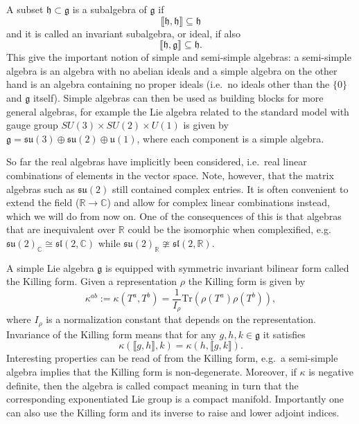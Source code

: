 A subset $\mathfrak{h}\subset \mathfrak{g}$ is a subalgebra of $\mathfrak{g}$ if \begin{equation}
    \llbracket\mathfrak{h},\mathfrak{h}\rrbracket\subseteq \mathfrak{h}
\end{equation} 
and it is called an invariant subalgebra, or ideal, if also
\begin{equation}
    \llbracket\mathfrak{h},\mathfrak{g}\rrbracket\subseteq \mathfrak{h}.
\end{equation}
This give the important notion of simple and semi-simple algebras: a semi-simple algebra is an algebra with no abelian ideals and a simple algebra on the other hand is an algebra containing no proper ideals (i.e.\ no ideals other than the $\{0\}$ and $\mathfrak{g}$ itself). Simple algebras can then be used as building blocks for more general algebras, for example the Lie algebra related to the standard model with gauge group $SU(3)\times SU(2)\times U(1)$ is given by $\mathfrak{g}=\mathfrak{su}(3)\oplus\mathfrak{su}(2)\oplus\mathfrak{u}(1)$, where each component is a simple algebra. 

So far the real algebras have implicitly been considered, i.e.\ real linear combinations of elements in the vector space. Note, however, that the matrix algebras such as $\mathfrak{su}(2)$ still contained complex entries. It is often convenient to extend the field ($\mathbb{R}\to\mathbb{C}$) and allow for complex linear combinations instead, which we will do from now on. One of the consequences of this is that algebras that are inequivalent over $\mathbb{R}$ could be the isomorphic when complexified, e.g.\ $\mathfrak{su}(2)_\mathbb{C}\cong \mathfrak{sl}(2,\mathbb{C})$ while $\mathfrak{su}(2)_\mathbb{R}\ncong\mathfrak{sl}(2,\mathbb{\mathbb{R}})$. 

A simple Lie algebra $\mathfrak{g}$ is equipped with symmetric invariant bilinear form called the Killing form. Given a representation $\rho$ the Killing form is given by 
\begin{equation}
    \kappa^{ab} := \kappa(T^a,T^b) =  \frac{1}{I_\rho}\text{Tr}\left(\rho(T^a)\rho(T^b)\right),
\end{equation}
where $I_\rho$ is a normalization constant that depends on the representation. Invariance of the Killing form means that for any $g,h,k\in\mathfrak{g}$ it satisfies 
\begin{equation}
    \kappa(\llbracket g,h\rrbracket,k) = \kappa(h,\llbracket g,k\rrbracket). 
\end{equation}
Interesting properties can be read of from the Killing form, e.g.\ a semi-simple algebra implies that the Killing form is non-degenerate. Moreover, if $\kappa$ is negative definite, then the algebra is called compact meaning in turn that the corresponding exponentiated Lie group is a compact manifold. Importantly one can also use the Killing form and its inverse to raise and lower adjoint indices.


